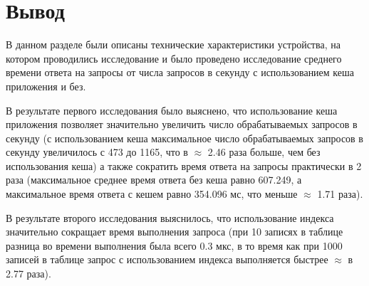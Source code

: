 \section*{Вывод}

В данном разделе были описаны технические характеристики устройства, на котором проводились исследование и было проведено исследование среднего времени ответа на запросы от числа запросов в секунду с использованием кеша приложения и без.

В результате первого исследования было выяснено, что использование кеша приложения позволяет значительно увеличить число обрабатываемых запросов в секунду (с использованием кеша максимальное число обрабатываемых запросов в секунду увеличилось с 473 до 1165, что в $\approx$ 2.46 раза больше, чем без использования кеша) а также сократить время ответа на запросы практически в 2 раза (максимальное среднее время ответа без кеша равно 607.249, а максимальное время ответа с кешем равно 354.096 мс, что меньше $\approx$ 1.71 раза).

В результате второго исследования выяснилось, что использование индекса значительно сокращает время выполнения запроса (при 10 записях в таблице разница во времени выполнения была всего 0.3 мкс, в то время как при 1000 записей в таблице запрос с использованием индекса выполняется быстрее $\approx$ в 2.77 раза).





